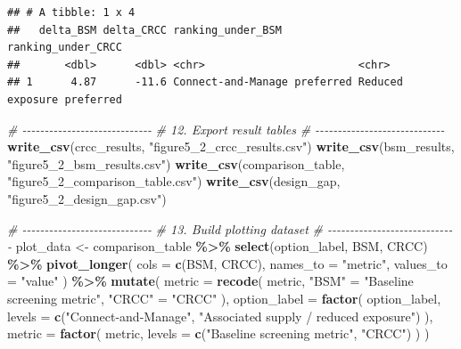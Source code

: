 \documentclass[
]{article}
\newenvironment{Shaded}{\begin{snugshade}}{\end{snugshade}}
\newcommand{\AttributeTok}[1]{\textcolor[rgb]{0.13,0.29,0.53}{#1}}
\newcommand{\CommentTok}[1]{\textcolor[rgb]{0.56,0.35,0.01}{\textit{#1}}}
\newcommand{\FunctionTok}[1]{\textcolor[rgb]{0.13,0.29,0.53}{\textbf{#1}}}
\newcommand{\NormalTok}[1]{#1}
\newcommand{\OtherTok}[1]{\textcolor[rgb]{0.56,0.35,0.01}{#1}}
\newcommand{\SpecialCharTok}[1]{\textcolor[rgb]{0.81,0.36,0.00}{\textbf{#1}}}
\newcommand{\StringTok}[1]{\textcolor[rgb]{0.31,0.60,0.02}{#1}}
\begin{document}
\begin{verbatim}
## # A tibble: 1 x 4
##   delta_BSM delta_CRCC ranking_under_BSM            ranking_under_CRCC        
##       <dbl>      <dbl> <chr>                        <chr>                     
## 1      4.87      -11.6 Connect-and-Manage preferred Reduced exposure preferred
\end{verbatim}

\begin{Shaded}
\begin{Highlighting}[]
\CommentTok{\# {-}{-}{-}{-}{-}{-}{-}{-}{-}{-}{-}{-}{-}{-}{-}{-}{-}{-}{-}{-}{-}{-}{-}{-}{-}{-}{-}{-}{-}}
\CommentTok{\# 12. Export result tables}
\CommentTok{\# {-}{-}{-}{-}{-}{-}{-}{-}{-}{-}{-}{-}{-}{-}{-}{-}{-}{-}{-}{-}{-}{-}{-}{-}{-}{-}{-}{-}{-}}
\FunctionTok{write\_csv}\NormalTok{(crcc\_results, }\StringTok{"figure5\_2\_crcc\_results.csv"}\NormalTok{)}
\FunctionTok{write\_csv}\NormalTok{(bsm\_results, }\StringTok{"figure5\_2\_bsm\_results.csv"}\NormalTok{)}
\FunctionTok{write\_csv}\NormalTok{(comparison\_table, }\StringTok{"figure5\_2\_comparison\_table.csv"}\NormalTok{)}
\FunctionTok{write\_csv}\NormalTok{(design\_gap, }\StringTok{"figure5\_2\_design\_gap.csv"}\NormalTok{)}

\CommentTok{\# {-}{-}{-}{-}{-}{-}{-}{-}{-}{-}{-}{-}{-}{-}{-}{-}{-}{-}{-}{-}{-}{-}{-}{-}{-}{-}{-}{-}{-}}
\CommentTok{\# 13. Build plotting dataset}
\CommentTok{\# {-}{-}{-}{-}{-}{-}{-}{-}{-}{-}{-}{-}{-}{-}{-}{-}{-}{-}{-}{-}{-}{-}{-}{-}{-}{-}{-}{-}{-}}
\NormalTok{plot\_data }\OtherTok{\textless{}{-}}\NormalTok{ comparison\_table }\SpecialCharTok{\%\textgreater{}\%}
  \FunctionTok{select}\NormalTok{(option\_label, BSM, CRCC) }\SpecialCharTok{\%\textgreater{}\%}
  \FunctionTok{pivot\_longer}\NormalTok{(}
    \AttributeTok{cols =} \FunctionTok{c}\NormalTok{(BSM, CRCC),}
    \AttributeTok{names\_to =} \StringTok{"metric"}\NormalTok{,}
    \AttributeTok{values\_to =} \StringTok{"value"}
\NormalTok{  ) }\SpecialCharTok{\%\textgreater{}\%}
  \FunctionTok{mutate}\NormalTok{(}
    \AttributeTok{metric =} \FunctionTok{recode}\NormalTok{(}
\NormalTok{      metric,}
      \StringTok{"BSM"} \OtherTok{=} \StringTok{"Baseline screening metric"}\NormalTok{,}
      \StringTok{"CRCC"} \OtherTok{=} \StringTok{"CRCC"}
\NormalTok{    ),}
    \AttributeTok{option\_label =} \FunctionTok{factor}\NormalTok{(}
\NormalTok{      option\_label,}
      \AttributeTok{levels =} \FunctionTok{c}\NormalTok{(}\StringTok{"Connect{-}and{-}Manage"}\NormalTok{, }\StringTok{"Associated supply / reduced exposure"}\NormalTok{)}
\NormalTok{    ),}
    \AttributeTok{metric =} \FunctionTok{factor}\NormalTok{(}
\NormalTok{      metric,}
      \AttributeTok{levels =} \FunctionTok{c}\NormalTok{(}\StringTok{"Baseline screening metric"}\NormalTok{, }\StringTok{"CRCC"}\NormalTok{)}
\NormalTok{    )}
\NormalTok{  )}


\end{Highlighting}
\end{Shaded}
\end{document}
